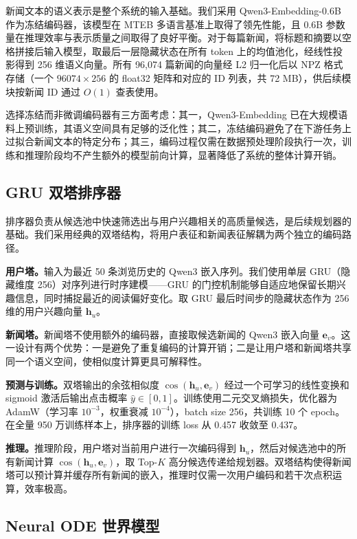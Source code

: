 \documentclass[twocolumn,10pt,a4paper]{ctexart}
\begin{document}
新闻文本的语义表示是整个系统的输入基础。我们采用 Qwen3-Embedding-0.6B~\cite{qwen3embedding} 作为冻结编码器，该模型在 MTEB 多语言基准上取得了领先性能，且 0.6B 参数量在推理效率与表示质量之间取得了良好平衡。对于每篇新闻，将标题和摘要以空格拼接后输入模型，取最后一层隐藏状态在所有 token 上的均值池化，经线性投影得到 256 维语义向量。所有 96,074 篇新闻的向量经 L2 归一化后以 NPZ 格式存储（一个 $96074\times 256$ 的 float32 矩阵和对应的 ID 列表，共 72 MB），供后续模块按新闻 ID 通过 $O(1)$ 查表使用。

选择冻结而非微调编码器有三方面考虑：其一，Qwen3-Embedding 已在大规模语料上预训练，其语义空间具有足够的泛化性；其二，冻结编码避免了在下游任务上过拟合新闻文本的特定分布；其三，编码过程仅需在数据预处理阶段执行一次，训练和推理阶段均不产生额外的模型前向计算，显著降低了系统的整体计算开销。

\subsection{GRU 双塔排序器}

排序器负责从候选池中快速筛选出与用户兴趣相关的高质量候选，是后续规划器的基础。我们采用经典的双塔结构，将用户表征和新闻表征解耦为两个独立的编码路径。

\textbf{用户塔。}输入为最近 50 条浏览历史的 Qwen3 嵌入序列。我们使用单层 GRU（隐藏维度 256）对序列进行时序建模——GRU 的门控机制能够自适应地保留长期兴趣信息，同时捕捉最近的阅读偏好变化。取 GRU 最后时间步的隐藏状态作为 256 维的用户兴趣向量 $\mathbf{h}_u$。

\textbf{新闻塔。}新闻塔不使用额外的编码器，直接取候选新闻的 Qwen3 嵌入向量 $\mathbf{e}_v$。这一设计有两个优势：一是避免了重复编码的计算开销；二是让用户塔和新闻塔共享同一个语义空间，使相似度计算更具可解释性。

\textbf{预测与训练。}双塔输出的余弦相似度 $\cos(\mathbf{h}_u, \mathbf{e}_v)$ 经过一个可学习的线性变换和 sigmoid 激活后输出点击概率 $\hat{y} \in [0, 1]$。训练使用二元交叉熵损失，优化器为 AdamW（学习率 $10^{-3}$，权重衰减 $10^{-4}$），batch size 256，共训练 10 个 epoch。在全量 950 万训练样本上，排序器的训练 loss 从 0.457 收敛至 0.437。

\textbf{推理。}推理阶段，用户塔对当前用户进行一次编码得到 $\mathbf{h}_u$，然后对候选池中的所有新闻计算 $\cos(\mathbf{h}_u, \mathbf{e}_v)$，取 Top-$K$ 高分候选传递给规划器。双塔结构使得新闻塔可以预计算并缓存所有新闻的嵌入，推理时仅需一次用户编码和若干次点积运算，效率极高。

\subsection{Neural ODE 世界模型}
\end{document}

